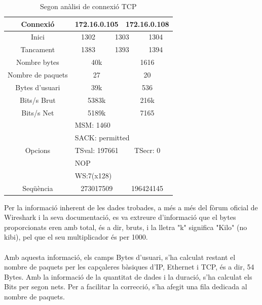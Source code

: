 \documentclass{article}
\begin{document}
\begin{table}[!h]
\centering
\begin{tabular}{c|cccccc}
Connexió &\multicolumn{3}{c}{172.16.0.105} &\multicolumn{3}{c}{172.16.0.108}\\
\hline
Inici &\multicolumn{2}{c}{1302} &\multicolumn{2}{c}{1303} &\multicolumn{2}{c}{1304}\\
\hline
Tancament &\multicolumn{2}{c}{1383} &\multicolumn{2}{c}{1393} &\multicolumn{2}{c}{1394}\\
\hline
Nombre bytes &\multicolumn{3}{c}{40k} &\multicolumn{3}{c}{1616}\\
\hline
Nombre de paquets &\multicolumn{3}{c}{27} &\multicolumn{3}{c}{20}\\
\hline
Bytes d'usuari &\multicolumn{3}{c}{39k} &\multicolumn{3}{c}{536}\\
\hline
Bits/s Brut &\multicolumn{3}{c}{5383k} &\multicolumn{3}{c}{216k}\\
\hline
Bits/s Net &\multicolumn{3}{c}{5189k} &\multicolumn{3}{c}{7165}\\
\hline
\multirow{5}{*}{Opcions} &\multicolumn{6}{l}{MSM: 1460} \\
&\multicolumn{6}{l}{SACK: permitted}\\
&\multicolumn{3}{c}{TSval: 197661} 
&\multicolumn{3}{c}{TSecr: 0}\\
&\multicolumn{6}{l}{NOP}\\
&\multicolumn{6}{l}{WS:7(x128)}\\
\hline
Seqüència &\multicolumn{3}{c}{273017509} &\multicolumn{3}{c}{196424145}\\
\end{tabular}
\caption{Segon anàlisi de connexió TCP}
\label{ana:snd}
\end{table}
Per la informació inherent de les dades trobades, a més a més del fòrum
oficial de Wireshark i la seva documentació, es va extreure d'informació
que el bytes proporcionats eren amb total, és a dir, bruts, i la lletra
"k" significa "Kilo" (no kibi), pel que el seu multiplicador és per 1000.\\
\\
Amb aquesta informació, els camps Bytes d'usuari, s'ha calculat restant el nombre
de paquets per les capçaleres bàsiques d'IP, Ethernet i TCP, és a dir, 54 Bytes.
Amb la informació de la quantitat de dades i la duració, s'ha calculat els
Bits per segon nets. Per a facilitar la correcció, s'ha afegit una
fila dedicada al nombre de paquets.\\\\
\end{document}
